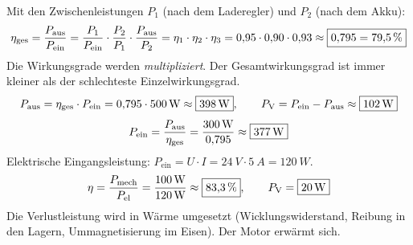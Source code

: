 \documentclass[11pt,a4paper]{article}
\begin{document}
\begin{loesung}
Mit den Zwischenleistungen $P_1$ (nach dem Laderegler) und $P_2$ (nach dem Akku):
\[
  \eta_\text{ges} = \frac{P_\text{aus}}{P_\text{ein}}
  = \frac{P_1}{P_\text{ein}}\cdot\frac{P_2}{P_1}\cdot\frac{P_\text{aus}}{P_2}
  = \eta_1\cdot\eta_2\cdot\eta_3
  = 0{,}95\cdot 0{,}90\cdot 0{,}93 \approx \boxed{0{,}795 = \SI{79.5}{\percent}}
\]
Die Wirkungsgrade werden \emph{multipliziert}. Der Gesamtwirkungsgrad ist immer kleiner als der schlechteste Einzelwirkungsgrad.
\[
  P_\text{aus} = \eta_\text{ges}\cdot P_\text{ein} = 0{,}795\cdot\SI{500}{W} \approx \boxed{\SI{398}{W}},
  \qquad P_\text{V} = P_\text{ein}-P_\text{aus} \approx \boxed{\SI{102}{W}}
\]
\[
  P_\text{ein} = \frac{P_\text{aus}}{\eta_\text{ges}} = \frac{\SI{300}{W}}{0{,}795} \approx \boxed{\SI{377}{W}}
\]
Elektrische Eingangsleistung: $P_\text{ein} = U\cdot I = \SI{24}{V}\cdot\SI{5}{A} = \SI{120}{W}$.
\[
  \eta = \frac{P_\text{mech}}{P_\text{el}} = \frac{\SI{100}{W}}{\SI{120}{W}} \approx \boxed{\SI{83.3}{\percent}},
  \qquad P_\text{V} = \boxed{\SI{20}{W}}
\]
Die Verlustleistung wird in Wärme umgesetzt (Wicklungswiderstand, Reibung in den Lagern, Ummagnetisierung im Eisen). Der Motor erwärmt sich.
\end{loesung}
\end{document}
